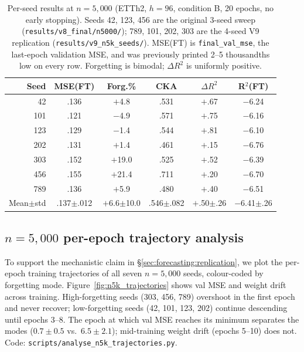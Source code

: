 \begin{table}[t]
\centering
\caption{Per-seed results at $n{=}5{,}000$ (ETTh2, $h{=}96$, condition B,
20 epochs, no early stopping).  Seeds 42, 123, 456 are the original 3-seed sweep
(\texttt{results/v8\_final/n5000/}); 789, 101, 202, 303 are the 4-seed V9
replication (\texttt{results/v9\_n5k\_seeds/}).  MSE(FT) is
\texttt{final\_val\_mse}, the last-epoch validation MSE, and was previously
printed 2--5 thousandths low on every row.  Forgetting is bimodal; $\Delta R^2$
is uniformly positive.}
\label{tab:n5k_seeds}
\small
\begin{tabular}{rccccc}
\toprule
Seed & MSE(FT) & Forg.\% & CKA & $\Delta R^2$ & R$^2$(FT) \\
\midrule
 42  & .136 & $+$4.8  & .531 & $+$.67 & $-$6.24 \\
101  & .121 & $-$4.9  & .571 & $+$.75 & $-$6.16 \\
123  & .129 & $-$1.4  & .544 & $+$.81 & $-$6.10 \\
202  & .131 & $+$1.4  & .461 & $+$.15 & $-$6.76 \\
303  & .152 & $+$19.0 & .525 & $+$.52 & $-$6.39 \\
456  & .155 & $+$21.4 & .711 & $+$.20 & $-$6.70 \\
789  & .136 & $+$5.9  & .480 & $+$.40 & $-$6.51 \\
\midrule
Mean$\pm$std & .137$\pm$.012 & $+$6.6$\pm$10.0 & .546$\pm$.082 & $+$.50$\pm$.26 & $-$6.41$\pm$.26 \\
\bottomrule
\end{tabular}
\end{table}

\subsection{$n{=}5{,}000$ per-epoch trajectory analysis}
\label{app:n5k_trajectories}

To support the mechanistic claim in \S\ref{sec:forecasting:replication}, we plot the
per-epoch training trajectories of all seven $n{=}5{,}000$ seeds,
colour-coded by forgetting mode.  Figure~\ref{fig:n5k_trajectories}
shows val MSE and weight drift across training.  High-forgetting seeds
(303, 456, 789) overshoot in the first epoch and never recover;
low-forgetting seeds (42, 101, 123, 202) continue descending until
epochs 3--8.  The epoch at which val MSE reaches its minimum separates
the modes ($0.7\pm0.5$ vs.\ $6.5\pm2.1$); mid-training weight drift
(epochs 5--10) does not.  Code: \texttt{scripts/analyse\_n5k\_trajectories.py}.


